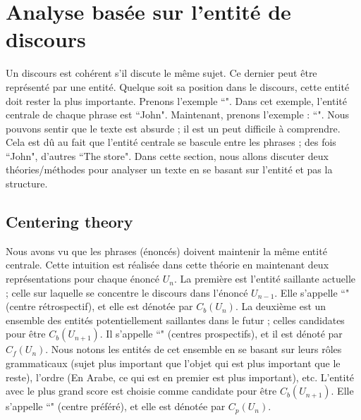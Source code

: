 \documentclass{KodeBook}
\begin{document}
\section{Analyse basée sur l'entité de discours}

Un discours est cohérent s'il discute le même sujet.
Ce dernier peut être représenté par une entité. 
Quelque soit sa position dans le discours, cette entité doit rester la plus importante.
Prenons l'exemple ``". 
Dans cet exemple, l'entité centrale de chaque phrase est ``John". 
Maintenant, prenons l'exemple : ``".
Nous pouvons sentir que le texte est absurde ; il est un peut difficile à comprendre. 
Cela est dû au fait que l'entité centrale se bascule entre les phrases ; des fois ``John", d'autres ``The store". 
Dans cette section, nous allons discuter deux théories/méthodes pour analyser un texte en se basant sur l'entité et pas la structure.

\subsection{Centering theory}

Nous avons vu que les phrases (énoncés) doivent maintenir la même entité centrale. 
Cette intuition est réalisée dans cette théorie en maintenant deux représentations pour chaque énoncé $U_n$.
La première est l'entité saillante actuelle ; celle sur laquelle se concentre le discours dans l'énoncé $ U_{n-1} $.
Elle s'appelle ``" (centre rétrospectif), et elle est dénotée par $C_b(U_n)$. 
La deuxième est un ensemble des entités potentiellement saillantes dans le futur ; celles candidates pour être $C_b(U_{n+1})$.
Il s'appelle ``" (centres prospectifs), et il est dénoté par $C_f(U_n)$. 
Nous notons les entités de cet ensemble en se basant sur leurs rôles grammaticaux (sujet plus important que l'objet qui est plus important que le reste), l'ordre (En Arabe, ce qui est en premier est plus important), etc.
L'entité avec le plus grand score est choisie comme candidate pour être $C_b(U_{n+1})$.
Elle s'appelle ``" (centre préféré), et elle est dénotée par $C_p(U_n)$. 
\end{document}
